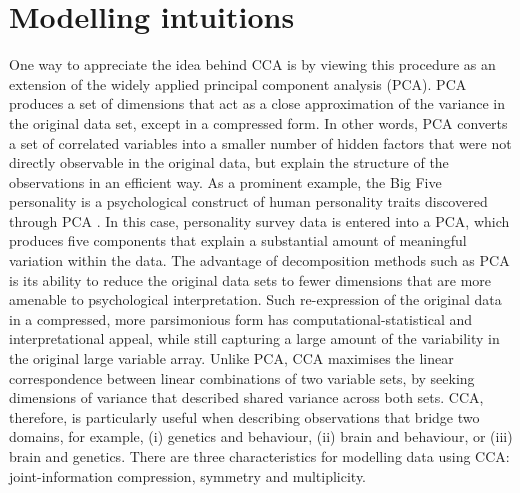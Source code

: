 \section{Modelling intuitions}
\label{ch:methods:intuitions}
One way to appreciate the idea behind CCA is by viewing this procedure as an extension of the widely applied principal component analysis (PCA). PCA produces a set of dimensions that act as a close approximation of the variance in the original data set, except in a compressed form. In other words, PCA converts a set of correlated variables into a smaller number of hidden factors that were not directly observable in the original data, but explain the structure of the observations in an efficient way. As a prominent example, the Big Five personality is a psychological construct of human personality traits discovered through PCA \cite{Barrick1991}. In this case, personality survey data is entered into a PCA, which produces five components that explain a substantial amount of meaningful variation within the data. The advantage of decomposition methods such as PCA is its ability to reduce the original data sets to fewer dimensions that are more amenable to psychological interpretation. Such re-expression of the original data in a compressed, more parsimonious form has computational-statistical and interpretational appeal, while still capturing a large amount of the variability in the original large variable array. Unlike PCA, CCA maximises the linear correspondence between linear combinations of two variable sets, by seeking dimensions of variance that described shared variance across both sets. CCA, therefore, is particularly useful when describing observations that bridge two domains, for example, (i) genetics and behaviour, (ii) brain and behaviour, or (iii) brain and genetics. There are three characteristics for modelling data using CCA: joint-information compression, symmetry and multiplicity.

